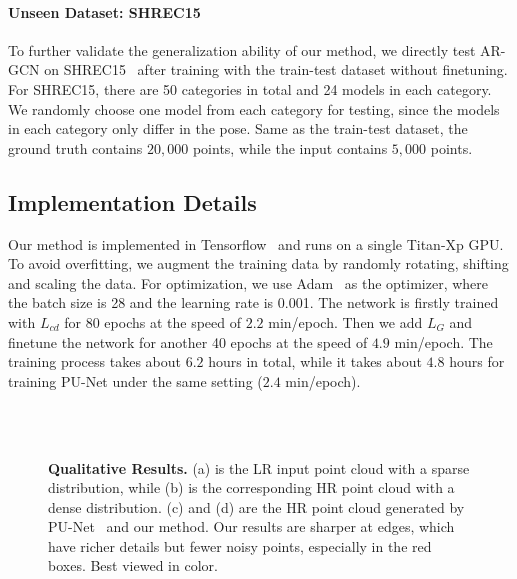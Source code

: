 \documentclass[10pt,twocolumn,letterpaper]{article}
\begin{document}
\vspace{-1em}
\paragraph{Unseen Dataset: SHREC15} To further validate the generalization ability of our method, we directly test AR-GCN on SHREC15~\cite{Lian:2015:NSR:2852282.2852307} after training with the train-test dataset without finetuning.
For SHREC15, there are 50 categories in total and 24 models in each category.
We randomly choose one model from each category for testing, since the models in each category only differ in the pose.
Same as the train-test dataset, the ground truth contains $20,000$ points, while the input contains $5,000$ points.

\subsection{Implementation Details}
\label{sec:training}
Our method is implemented in Tensorflow~\cite{abadi2016tensorflow} and runs on a single Titan-Xp GPU.
To avoid overfitting, we augment the training data by randomly rotating, shifting and scaling the data.
For optimization, we use Adam~\cite{kingma2014adam} as the optimizer, where the batch size is 28 and the learning rate is 0.001.
The network is firstly trained with $L_{cd}$ for 80 epochs at the speed of $2.2$ min/epoch.
Then we add $L_G$ and finetune the network for another 40 epochs at the speed of $4.9$ min/epoch.
The training process takes about $6.2$ hours in total, while it takes about $4.8$ hours for training PU-Net under the same setting ($2.4$ min/epoch).

\begin{figure*}
\captionsetup[subfigure]{labelformat=empty}
\begin{center}
	\hfill
	\hfill
	\hfill
	\\
	\hfill
	\hfill
	\hfill
	\\
\end{center}
	\vspace{-1.5em}
	\caption{\textbf{Qualitative Results.} (a) is the LR input point cloud with a sparse distribution, while (b) is the corresponding HR point cloud with a dense distribution. (c) and (d) are the HR point cloud generated by PU-Net~\cite{yu2018pu} and our method. Our results are sharper at edges, which have richer details but fewer noisy points, especially in the red boxes. Best viewed in color.}
	\label{fig:visual}
\end{figure*}
\end{document}
